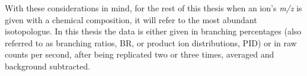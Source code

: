 With these considerations in mind, for the rest of this thesis when an ion's \textit{m/z} is given with a chemical composition, it will refer to the most abundant isotopologue.
In  this thesis  the data is either given in branching percentages (also referred to as branching ratios, BR, or product ion distributions, PID) 
or in raw counts per second, %
after being  replicated two or three times, averaged and background subtracted.




















